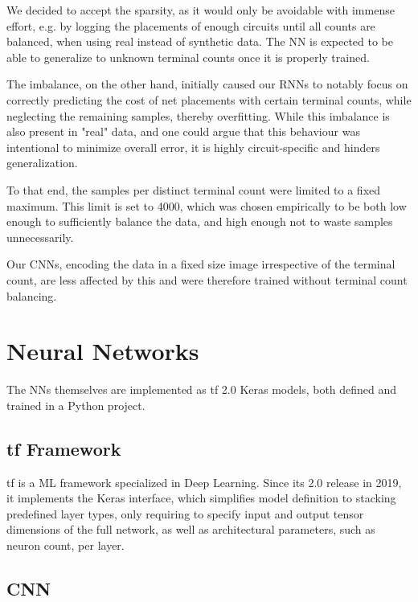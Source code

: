 We decided to accept the sparsity, as it would only be avoidable with immense effort, e.g. by logging the placements of enough circuits until all counts are balanced, when using real instead of synthetic data. The \gls{NN} is expected to be able to generalize to unknown terminal counts once it is properly trained.

The imbalance, on the other hand, initially caused our \glspl{RNN} to notably focus on correctly predicting the cost of net placements with certain terminal counts, while neglecting the remaining samples, thereby overfitting. While this imbalance is also present in "real" data, and one could argue that this behaviour was intentional to minimize overall error, it is highly circuit-specific and hinders generalization.

To that end, the samples per distinct terminal count were limited to a fixed maximum. This limit is set to 4000, which was chosen empirically to be both low enough to sufficiently balance the data, and high enough not to waste samples unnecessarily.

Our \glspl{CNN}, encoding the data in a fixed size image irrespective of the terminal count, are less affected by this and were therefore trained without terminal count balancing.

\section{Neural Networks}

The \glspl{NN} themselves are implemented as \gls{tf} 2.0 Keras models, both defined and trained in a Python project.

\subsection{\gls{tf} Framework}

\gls{tf} is a \gls{ML} framework specialized in Deep Learning.\cite{tensorflow2015-whitepaper} Since its 2.0 release in 2019, it implements the Keras interface\cite{chollet2015keras}, which simplifies model definition to stacking predefined layer types, only requiring to specify input and output tensor dimensions of the full network, as well as architectural parameters, such as neuron count, per layer.

\subsection{\gls{CNN}}

